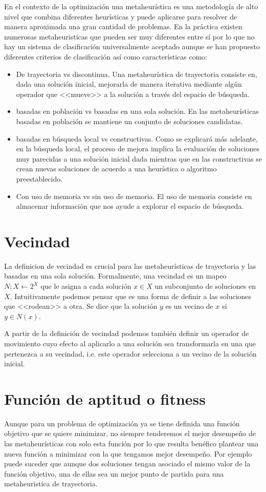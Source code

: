 En el contexto de la optimización una metaheurística es una metodología de alto nivel que combina diferentes heurísticas y puede aplicarse para resolver de manera aproximada una gran cantidad de problemas. En la práctica existen numerosas metaheuristicas que pueden ser muy diferentes entre sí por lo que no hay un sistema de clasificación universalmente aceptado aunque se han propuesto diferentes criterios de clasificación \cite{Stegherr2020} así como características como:
\begin{itemize}
\item De trayectoria vs discontinua. Una metaheurística de trayectoria consiste en, dada una solución inicial, mejorarla de manera iterativa mediante algún operador que <<mueve>> a la solución a través del espacio de búsqueda.
\item basadas en población vs basadas en una sola solución. En las metaheurísticas basadas en población se mantiene un conjunto de soluciones candidatas.
\item basadas en búsqueda local vs constructivas. Como se explicará más adelante, en la búsqueda local, el proceso de mejora implica la evaluación de soluciones muy parecidas a una solución inicial dada mientras que en las constructivas se crean nuevas soluciones de acuerdo a una heurística o algoritmo preestablecido.
\item Con uso de memoria vs sin uso de memoria. El uso de memoria consiste en almacenar información que nos ayude a explorar el espacio de búsqueda.
\end{itemize} 

\section{Vecindad}
La definicion de vecindad es crucial para las metaheurísticas de trayectoria y las basadas en una sola solución.
Formalmente, una vecindad es un mapeo $N:X\leftarrow 2^X$ que le asigna a cada solución $x\in X$ un subconjunto de soluciones en $X$. Intuitivamente podemos pensar que es una forma de definir a las soluciones que <<rodean>> a otra. Se dice que la solución $y$ es un vecino de $x$ si $y\in N(x)$.

A partir de la definición de vecindad podemos también definir un operador de movimiento cuyo efecto al aplicarlo a una solución sea transformarla en una que pertenezca a su vecindad, i.e. este operador selecciona a un vecino de la solución inicial.  
 
\section{Función de aptitud o fitness}
Aunque para un problema de optimización ya se tiene definida una función objetivo que se quiere minimizar, no siempre tenderemos el mejor desempeño de las metaheurísticas con solo esta función por lo que resulta benéfico plantear una nueva función a minimizar con la que tengamos mejor desempeño. Por ejemplo puede suceder que aunque dos soluciones tengan asociado el mismo valor de la función objetivo, una de ellas sea un mejor punto de partida para una metaheuristica de trayectoria.

